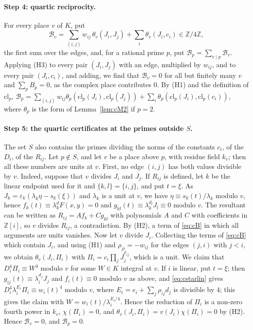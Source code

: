 \documentclass[11pt]{article}
\newcommand{\Z}{\mathbb{Z}}
\begin{document}
\paragraph{Step 4: quartic reciprocity.} For every place $v$ of $K$, put
\begin{equation}\label{eq:cB}
\mathcal B_v=\sum_{(i,j)}w_{ij}\,\theta_v(J_i,J_j)+\sum_i\theta_v(J_i,c_i)\in\Z/4\Z,
\end{equation}
the first sum over the edges, and, for a rational prime $p$, put $\mathcal B_p=\sum_{v\mid p}\mathcal B_v$. Applying (H3) to every pair $(J_i,J_j)$ with an edge, multiplied by $w_{ij}$, and to every pair $(J_i,c_i)$, and adding, we find that $\mathcal B_v=0$ for all but finitely many $v$ and $\sum_pB_p=0$, as the complex place contributes $0$. By (H1) and the definition of $\mathrm{cl}_p$, $\mathcal B_p=\sum_{(i,j)}w_{ij}\theta_p(\mathrm{cl}_p(J_i),\mathrm{cl}_p(J_j))+\sum_i\theta_p(\mathrm{cl}_p(J_i),\mathrm{cl}_p(c_i))$, where $\theta_p$ is the form of Lemma~\ref{lem:cM2} if $p=2$.

\paragraph{Step 5: the quartic certificates at the primes outside $S$.} The set $S$ also contains the primes dividing the norms of the constants $c_i$, of the $D_i$, of the $R_{ij}$. Let $p\notin S$, and let $v$ be a place above $p$, with residue field $k_v$; then all these numbers are units at $v$. First, no edge $(i,j)$ has both values divisible by $v$. Indeed, suppose that $v$ divides $J_i$ and $J_j$. If $R_{ij}$ is defined, let $k$ be the linear endpoint used for it and $\{k,l\}=\{i,j\}$, and put $t=\xi$. As $J_k=\varepsilon_k(\lambda_k\eta-s_k(\xi))$ and $\lambda_k$ is a unit at $v$, we have $\eta\equiv s_k(t)/\lambda_k$ modulo $v$, hence $f_k(t)\equiv\lambda_k^dF(x,y)=0$ and $g_{kl}(t)\equiv\lambda_k^{d_l}J_l\equiv0$ modulo $v$. The resultant can be written as $R_{ij}=Af_k+Cg_{kl}$ with polynomials $A$ and $C$ with coefficients in $\Z[i]$, so $v$ divides $R_{ij}$, a contradiction. By (H2), a term of \eqref{eq:cB} in which all arguments are units vanishes. Now let $v$ divide $J_i$. Collecting the terms of \eqref{eq:cB} which contain $J_i$, and using (H1) and $\rho_{ji}=-w_{ij}$ for the edges $(j,i)$ with $j<i$, we obtain $\theta_v(J_i,\Pi_i)$ with $\Pi_i=c_i\prod_jJ_j^{\rho_{ij}}$, which is a unit. We claim that $D_i^4\Pi_i\equiv W^4$ modulo $v$ for some $W\in K$ integral at $v$. If $i$ is linear, put $t=\xi$; then $g_{ij}(t)\equiv\lambda_i^{d_j}J_j$ and $f_i(t)\equiv0$ modulo $v$ as above, and \eqref{eq:cstarlin} gives $D_i^4\lambda_i^{E_i}\Pi_i\equiv w_i(t)^4$ modulo $v$, where $E_i=e_i+\sum_j\rho_{ij}d_j$ is divisible by $4$; this gives the claim with $W=w_i(t)/\lambda_i^{E_i/4}$. Hence the reduction of $\Pi_i$ is a non-zero fourth power in $k_v$, $\chi(\Pi_i)=0$, and $\theta_v(J_i,\Pi_i)=v(J_i)\chi(\Pi_i)=0$ by (H2). Hence $\mathcal B_v=0$, and $\mathcal B_p=0$.
\end{document}
